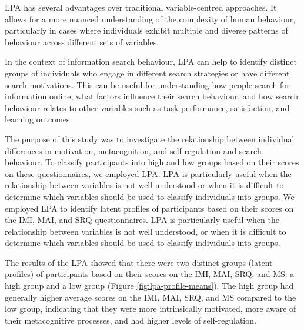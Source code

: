 \documentclass[letterpaper, nobind]{templates/ociamthesis}
\begin{document}
LPA has several advantages over traditional variable-centred approaches. It allows for a more nuanced understanding of the complexity of human behaviour, particularly in cases where individuals exhibit multiple and diverse patterns of behaviour across different sets of variables.

In the context of information search behaviour, LPA can help to identify distinct groups of individuals who engage in different search strategies or have different search motivations. This can be useful for understanding how people search for information online, what factors influence their search behaviour, and how search behaviour relates to other variables such as task performance, satisfaction, and learning outcomes.

The purpose of this study was to investigate the relationship between individual differences in motivation, metacognition, and self-regulation and search behaviour.
To classify participants into high and low groups based on their scores on these questionnaires, we employed LPA.
LPA is particularly useful when the relationship between variables is not well understood or when it is difficult to determine which variables should be used to classify individuals into groups.
We employed LPA to identify latent profiles of participants based on their scores on the IMI, MAI, and SRQ questionnaires.
LPA is particularly useful when the relationship between variables is not well understood, or when it is difficult to determine which variables should be used to classify individuals into groups.

The results of the LPA showed that there were two distinct groups (latent profiles) of participants based on their scores on the IMI, MAI, SRQ, and MS: a high group and a low group (Figure \ref{fig:lpa-profile-means}). The high group had generally higher average scores on the IMI, MAI, SRQ, and MS compared to the low group, indicating that they were more intrinsically motivated, more aware of their metacognitive processes, and had higher levels of self-regulation.
\end{document}
